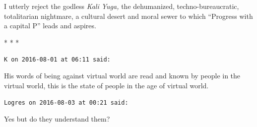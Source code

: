 I utterly reject the godless \emph{Kali Yuga,} the dehumanized, techno-bureaucratic, totalitarian nightmare, a cultural desert and moral sewer to which ``Progress with a capital P'' leads and aspires.



\begin{center}* * *\end{center}

\begin{footnotesize}
\begin{sffamily}
\texttt{K on 2016-08-01 at 06:11 said:}

His words of being against virtual world are read and known by people in the virtual world, this is the state of people in the age of virtual world.

\hfill

\texttt{Logres on 2016-08-03 at 00:21 said:}

Yes but do they understand them?


\hfill

\end{sffamily}
\end{footnotesize}

